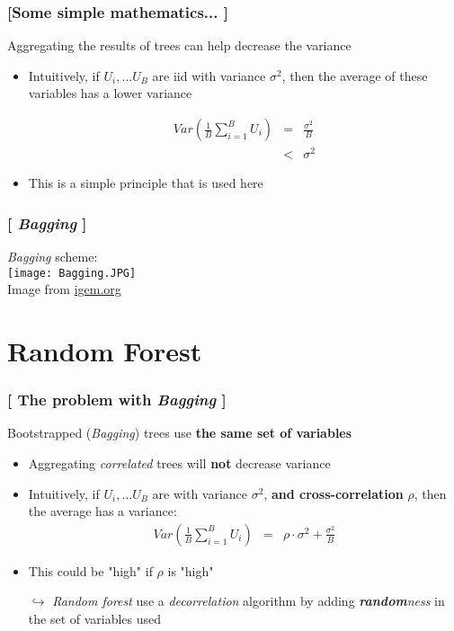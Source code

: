 \documentclass[xcolor=x11names,compress, aspectratio=169]{beamer}
\renewcommand{\(}{\begin{columns}}
\renewcommand{\)}{\end{columns}}
\newcommand{\<}[1]{\begin{column}{#1}}
\renewcommand{\>}{\end{column}}
\begin{document}
\begin{frame}
\frametitle{\textcolor{brique}{[Some simple mathematics... ]}}
Aggregating the results of trees can help decrease the variance %
\pause
\begin{itemize}[<+->]
    \item  Intuitively, if $U_{i}, \ldots U_{B}$ are  iid with variance $\sigma^{2}$, then the average of these variables has a lower variance
    \item[]
\begin{eqnarray*}
Var \left( \frac{1}{B} \sum_{i=1}^{B} U_i \right) &=&  \frac{\sigma^{2}}{B} \\
            & < & \sigma^{2}
\end{eqnarray*}
    \item This is a simple principle that is used here
\end{itemize}
\end{frame}

\begin{frame}
\frametitle{\textcolor{brique}{[ \textit{Bagging} ]}}
\textit{Bagging} scheme:\\
\texttt{[image: Bagging.JPG]}\\
\vfill
\textcolor{gris}{\small Image from \href{http://2018.igem.org/Team:Jilin_China/Model/Screening_System}{igem.org}}
\end{frame}

\section{Random Forest}

\begin{frame}
\frametitle{\textcolor{brique}{[ The problem with \textit{Bagging} ]}}
 Bootstrapped (\textit{Bagging}) trees use \textbf{the same set of variables}
\pause
\begin{itemize}[<+->]
    \item Aggregating  \textit{correlated} trees  will \textbf{not}  decrease variance
    \item   Intuitively, if $U_{i}, \ldots U_{B}$ are with variance $\sigma^{2}$, \textbf{and cross-correlation} $\rho$,   then the average has a variance:
\begin{eqnarray*}
Var \left( \frac{1}{B} \sum_{i=1}^{B} U_i \right)  &=&   \rho \cdot \sigma^{2} + \frac{\sigma^{2}}{B}
\end{eqnarray*}
    \item This could be "high" if $\rho$ is "high"
    \item[$\hookrightarrow$] \textit{Random forest }use a \textit{decorrelation} algorithm by adding \textit{\textbf{random}ness} in the set of variables used
\end{itemize}
\end{frame}
\end{document}
